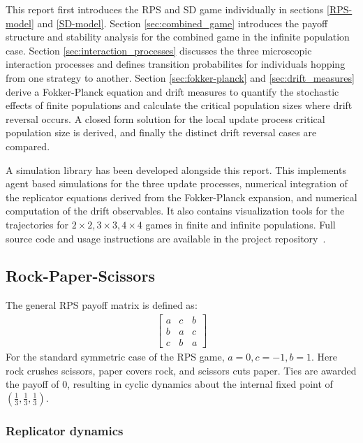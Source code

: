 \documentclass[%
 reprint,
 amsmath,amssymb,
 aps,
]{revtex4-2}
\begin{document}
This report first introduces the RPS and SD game individually in sections \ref{RPS-model} and \ref{SD-model}. 
Section \ref{sec:combined_game} introduces the payoff structure and stability analysis for the combined game 
in the infinite population case. Section \ref{sec:interaction_processes} discusses the three microscopic 
interaction processes and 
defines transition probabilites for individuals hopping from one strategy to another. Section 
\ref{sec:fokker-planck} and \ref{sec:drift_measures} derive a 
Fokker-Planck equation and drift measures to quantify the stochastic effects of finite populations and 
calculate the critical population sizes where drift reversal occurs. A closed form solution for the local update process
critical population size is derived, and finally the distinct drift reversal cases are compared.

A simulation library has been developed alongside this report. This implements agent based simulations for the three
update processes, numerical integration of the replicator equations derived from the 
Fokker-Planck expansion, and numerical computation of the drift observables. It also contains 
visualization tools for the trajectories for $2 \times 2, 3 \times 3, 4 \times 4$ games in finite and infinite 
populations. Full source code and usage instructions are available in the project repository~\cite{project_appendix}.

\subsection{\label{RPS-model} Rock-Paper-Scissors}
The general RPS payoff matrix is defined as:
\begin{align}
\begin{bmatrix}
    a & c & b\\
    b & a & c\\
    c & b & a
\end{bmatrix}
\end{align}
For the standard symmetric case of the RPS game, $a = 0, c = -1, b = 1$.
Here rock crushes scissors, paper covers rock, and scissors cuts paper. 
Ties are awarded the payoff of 0, resulting in cyclic dynamics about the internal
fixed point of $\left(\frac{1}{3}, \frac{1}{3}, \frac{1}{3}\right)$.

\subsubsection{\label{sec:rps_replicator} Replicator dynamics}
\end{document}
